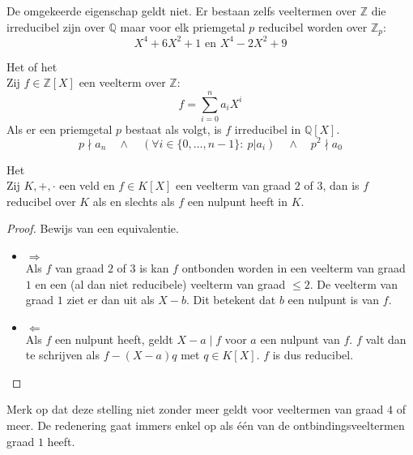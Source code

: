 \documentclass[main.tex]{subfiles}
\begin{document}
\begin{opm}
  De omgekeerde eigenschap geldt niet.
  Er bestaan zelfs veeltermen over $\mathbb{Z}$ die irreducibel zijn over $\mathbb{Q}$ maar voor elk priemgetal $p$ reducibel worden over $\mathbb{Z}_{p}$:
  \[ X^{4}+ 6X^{2}+1 \text{ en } X^{4} -2X^{2} + 9 \]
\end{opm}

\begin{ei}
  Het  of het \\
  Zij $f\in \mathbb{Z}[X]$ een veelterm over $\mathbb{Z}$:
  \[ f = \sum_{i=0}^{n}a_{i}X^{i}\]
  Als er een priemgetal $p$ bestaat als volgt, is $f$ irreducibel in $\mathbb{Q}[X]$.
  \[ p \nmid a_{n} \quad\wedge\quad (\forall i \in \{0,\dotsc,n-1\}:\ p |a_{i}) \quad\wedge\quad p^{2} \nmid a_{0} \]
\end{ei}

\begin{ei}
  Het \\
  Zij $K,+,\cdot$ een veld en $f\in K[X]$ een veelterm van graad $2$ of $3$, dan is $f$ reducibel over $K$ als en slechts als $f$ een nulpunt heeft in $K$.

  \begin{proof}
    Bewijs van een equivalentie.
    \begin{itemize}
    \item $\Rightarrow$\\
      Als $f$ van graad $2$ of $3$ is kan $f$ ontbonden worden in een veelterm van graad $1$ en een (al dan niet reducibele) veelterm van graad $\le 2$.
      De veelterm van graad $1$ ziet er dan uit als $X-b$.\waarom
      Dit betekent dat $b$ een nulpunt is van $f$.
    \item $\Leftarrow$\\
      Als $f$ een nulpunt heeft, geldt $X-a \mid f$  voor $a$ een nulpunt van $f$.
      $f$ valt dan te schrijven als $f-(X-a)q$ met $q\in K[X]$.
      $f$ is dus reducibel.
    \end{itemize}
  \end{proof}
\end{ei}

\begin{opm}
  Merk op dat deze stelling niet zonder meer geldt voor veeltermen van graad $4$ of meer.
  De redenering gaat immers enkel op als \'e\'en van de ontbindingsveeltermen graad $1$ heeft.
\end{opm}
\end{document}

